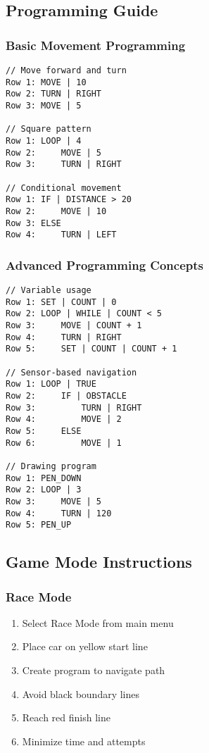 \subsection{Programming Guide}

\subsubsection{Basic Movement Programming}

\begin{lstlisting}[caption=Simple Movement Examples]
// Move forward and turn
Row 1: MOVE | 10
Row 2: TURN | RIGHT
Row 3: MOVE | 5

// Square pattern
Row 1: LOOP | 4
Row 2:     MOVE | 5
Row 3:     TURN | RIGHT

// Conditional movement
Row 1: IF | DISTANCE > 20
Row 2:     MOVE | 10
Row 3: ELSE
Row 4:     TURN | LEFT
\end{lstlisting}

\subsubsection{Advanced Programming Concepts}

\begin{lstlisting}[caption=Advanced Programming Examples]
// Variable usage
Row 1: SET | COUNT | 0
Row 2: LOOP | WHILE | COUNT < 5
Row 3:     MOVE | COUNT + 1
Row 4:     TURN | RIGHT
Row 5:     SET | COUNT | COUNT + 1

// Sensor-based navigation
Row 1: LOOP | TRUE
Row 2:     IF | OBSTACLE
Row 3:         TURN | RIGHT
Row 4:         MOVE | 2
Row 5:     ELSE
Row 6:         MOVE | 1

// Drawing program
Row 1: PEN_DOWN
Row 2: LOOP | 3
Row 3:     MOVE | 5
Row 4:     TURN | 120
Row 5: PEN_UP
\end{lstlisting}

\subsection{Game Mode Instructions}

\subsubsection{Race Mode}

\begin{enumerate}
    \item Select Race Mode from main menu
    \item Place car on yellow start line
    \item Create program to navigate path
    \item Avoid black boundary lines
    \item Reach red finish line
    \item Minimize time and attempts
\end{enumerate}

